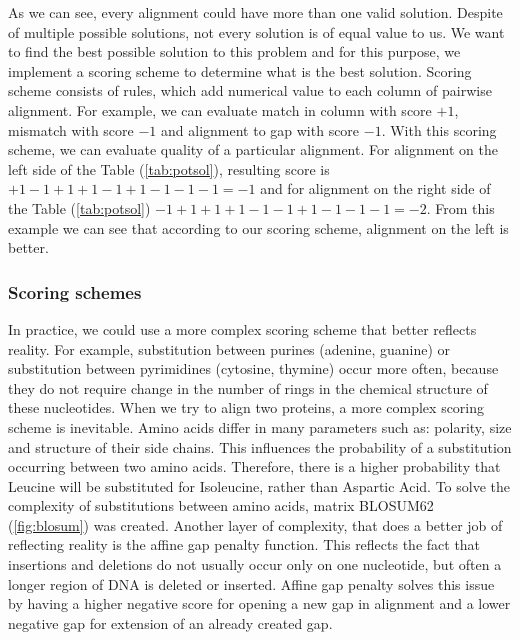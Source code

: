 As we can see, every alignment could have more than one valid solution.
Despite of multiple possible solutions, not every solution is of equal value to us.
We want to find the best possible solution to this problem and for this purpose, we implement a scoring scheme to determine what is the best solution.
Scoring scheme consists of rules, which add numerical value to each column of pairwise alignment.
For example, we can evaluate match in column with score $+1$, mismatch with score $-1$ and alignment to gap with score $-1$.
With this scoring scheme, we can evaluate quality of a particular alignment.
For alignment on the left side of the Table (\ref{tab:potsol}), resulting score is $+1-1+1+1-1+1-1-1-1 = -1$ and for alignment on the right side of the Table (\ref{tab:potsol}) $-1+1+1+1-1-1+1-1-1-1 = -2$.
From this example we can see that according to our scoring scheme, alignment on the left is better.

\subsubsection{Scoring schemes}
In practice, we could use a more complex scoring scheme that better reflects reality.
For example, substitution between purines (adenine, guanine) or substitution between pyrimidines (cytosine, thymine) occur more often, because they do not require change in the number of rings in the chemical structure of these nucleotides.
When we try to align two proteins, a more complex scoring scheme is inevitable.
Amino acids differ in many parameters such as: polarity, size and structure of their side chains.
This influences the probability of a substitution occurring between two amino acids.
Therefore, there is a higher probability that Leucine will be substituted for Isoleucine, rather than Aspartic Acid.
To solve the complexity of substitutions between amino acids, matrix BLOSUM62 (\ref{fig:blosum}) was created.
Another layer of complexity, that does a better job of reflecting reality is the affine gap penalty function.
This reflects the fact that insertions and deletions do not usually occur only on one nucleotide, but often a longer region of DNA is deleted or inserted.
Affine gap penalty solves this issue by having a higher negative score for opening a new gap in alignment and a lower negative gap for extension of an already created gap.


